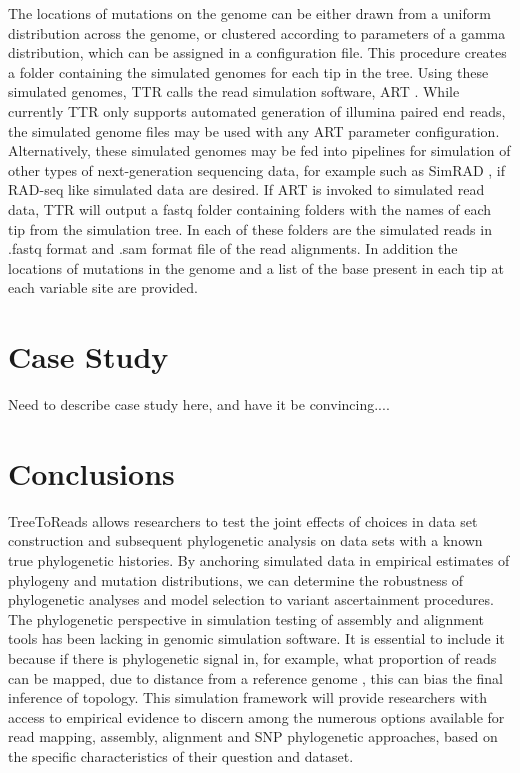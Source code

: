 \documentclass[a4paper,10pt]{article}
\begin{document}
The locations of mutations on the genome can be either drawn from a uniform distribution across the genome, 
or clustered according to parameters of a gamma distribution, which can be assigned in a configuration file.
This procedure creates a folder containing the simulated genomes for each tip in the tree.
Using these simulated genomes, TTR calls the read simulation software, ART \citep{huang_art:_2012}.
While currently TTR only supports automated generation of illumina paired end reads, 
the simulated genome files may be used with any ART parameter configuration.
Alternatively, these simulated genomes may be fed into pipelines for simulation of other types of next-generation sequencing data, 
for example such as SimRAD \citep{lepais_simrad:_2014}, if RAD-seq like simulated data are desired.
If ART is invoked to simulated read data, TTR will output a fastq folder containing folders with the names of each tip from the simulation tree. 
In each of these folders are the simulated reads  in .fastq format and .sam format file of the read alignments.
In addition the locations of mutations in the genome and a list of the base present in each tip at each variable site are provided.


\section{Case Study}
Need to describe case study here, and have it be convincing....


\section{Conclusions}
TreeToReads allows researchers to test the joint effects of choices in data set construction and subsequent phylogenetic analysis on data sets with a known true phylogenetic histories.
By anchoring simulated data in empirical estimates of phylogeny and mutation distributions, 
we can determine the robustness of phylogenetic analyses and model selection to variant ascertainment procedures.
The phylogenetic perspective in simulation testing of assembly and alignment tools has been lacking in genomic simulation software.
It is essential to include it because if there is phylogenetic signal in, for example, what proportion of reads can be mapped, due to distance from a reference genome \citep{bertels_automated_2014},
this can bias the final inference of topology.
This simulation framework will provide researchers with access to empirical evidence to discern among the numerous options available for read mapping, assembly, alignment and SNP phylogenetic approaches,
based on the specific characteristics of their question and dataset.


\end{document}
